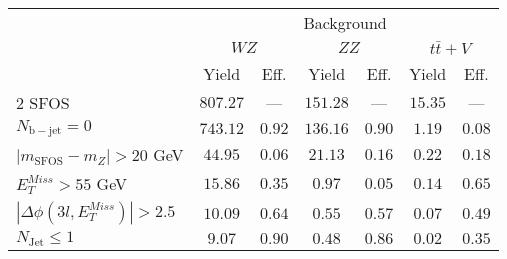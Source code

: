 \begin{tabular}{l||c|c||c|c||c|c}
\hline
 &       \multicolumn{6}{c}{Background} \\
 & \multicolumn{2}{c||}{$WZ$} & \multicolumn{2}{c||}{$ZZ$} & \multicolumn{2}{c}{$t\bar{t}+V$}  \\ 
 & Yield & Eff. & Yield & Eff. & Yield & Eff.  \\
\hline\hline
2 SFOS &  $807.27$ &  --- &  $151.28$ &  --- &  $15.35$ &  ---  \\ 
\hline
$N_{\mathrm{b-jet}}=0$ &  $743.12$ &  $0.92$ &  $136.16$ &  $0.90$ &  $1.19$ &  $0.08$ \\ 
\hline
$| m_{\mathrm{SFOS}} - m_Z | >  20$ GeV &  $44.95$ &  $0.06$ &  $21.13$ &  $0.16$ &  $0.22$ &  $0.18$\\ 
\hline
$E_{T}^{Miss} > 55$ GeV &  $15.86$ &  $0.35$ &  $0.97$ &  $0.05$ &  $0.14$ &  $0.65$ \\ 
\hline
$|\Delta\phi(3l,E_{T}^{Miss})| > 2.5$ &  $10.09$ &  $0.64$ &  $0.55$ &  $0.57$ &  $0.07$ &  $0.49$ \\ 
\hline
$N_{\mathrm{Jet}} \leq 1$ &  $9.07$ &  $0.90$ &  $0.48$ &  $0.86$ &  $0.02$ &  $0.35$ \\ 
\hline
\end{tabular}

